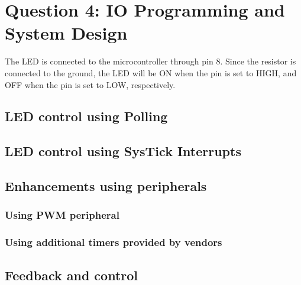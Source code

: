\section*{Question 4: \small{IO Programming and System Design}}
\setcounter{section}{4}

The LED is connected to the microcontroller through pin 8.
Since the resistor is connected to the ground, the LED will be ON when the pin is set to HIGH, and OFF when the pin is set to LOW, respectively.

\subsection{LED control using Polling}



\clearpage
\subsection{LED control using SysTick Interrupts}



\clearpage
\subsection{Enhancements using peripherals}

\subsubsection{Using PWM peripheral}



\clearpage
\subsubsection{Using additional timers provided by vendors}



\clearpage
\subsection{Feedback and control}


